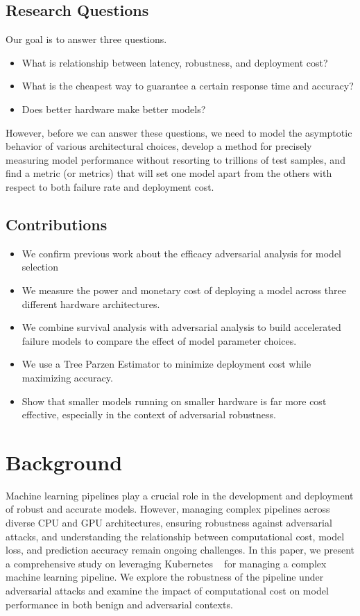 \documentclass[conference]{IEEEtran}
\begin{document}
\subsection{Research Questions}
Our goal is to answer three questions.
\begin{itemize}
    \item What is relationship between latency, robustness, and deployment cost?
    \item What is the cheapest way to guarantee a certain response time and accuracy?
    \item Does better hardware make better models?
\end{itemize}

However, before we can answer these questions, we need to model the asymptotic behavior of various architectural choices, develop a method for precisely measuring model performance without resorting to trillions of test samples, and find a metric (or metrics) that will set one model apart from the others with respect to both failure rate and deployment cost. 

\subsection{Contributions}
\begin{itemize}
    \item We confirm previous work about the efficacy adversarial analysis for model selection
    \item We measure the power and monetary cost of deploying a model across three different hardware architectures.
    \item We combine survival analysis with adversarial analysis to build accelerated failure models to compare the effect of model parameter choices.
    \item We use a Tree Parzen Estimator to minimize deployment cost while maximizing accuracy.
    \item Show that smaller models running on smaller hardware is far more cost effective, especially in the context of adversarial robustness.
\end{itemize}


\section{Background}
Machine learning pipelines play a crucial role in the development and deployment of robust and accurate models. However, managing complex pipelines across diverse CPU and GPU architectures, ensuring robustness against adversarial attacks, and understanding the relationship between computational cost, model loss, and prediction accuracy remain ongoing challenges. In this paper, we present a comprehensive study on leveraging Kubernetes ~\cite{k8s} for managing a complex machine learning pipeline. We explore the robustness of the pipeline under adversarial attacks and examine the impact of computational cost on model performance in both benign and adversarial contexts.
\end{document}
